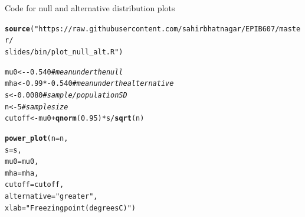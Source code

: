 \documentclass[10pt,handout]{beamer}\usepackage[]{graphicx}\usepackage[]{color}
\makeatletter
\newcommand{\hlnum}[1]{\textcolor[rgb]{0.686,0.059,0.569}{#1}}%
\newcommand{\hlstr}[1]{\textcolor[rgb]{0.192,0.494,0.8}{#1}}%
\newcommand{\hlcom}[1]{\textcolor[rgb]{0.678,0.584,0.686}{\textit{#1}}}%
\newcommand{\hlopt}[1]{\textcolor[rgb]{0,0,0}{#1}}%
\newcommand{\hlstd}[1]{\textcolor[rgb]{0.345,0.345,0.345}{#1}}%
\newcommand{\hlkwb}[1]{\textcolor[rgb]{0.69,0.353,0.396}{#1}}%
\newcommand{\hlkwc}[1]{\textcolor[rgb]{0.333,0.667,0.333}{#1}}%
\newcommand{\hlkwd}[1]{\textcolor[rgb]{0.737,0.353,0.396}{\textbf{#1}}}%
\newenvironment{kframe}{%
 \def\at@end@of@kframe{}%
 \ifinner\ifhmode%
  \def\at@end@of@kframe{\end{minipage}}%
  \begin{minipage}{\columnwidth}%
 \fi\fi%
 \def\FrameCommand##1{\hskip\@totalleftmargin \hskip-\fboxsep
 \colorbox{shadecolor}{##1}\hskip-\fboxsep
     \hskip-\linewidth \hskip-\@totalleftmargin \hskip\columnwidth}%
 \MakeFramed {\advance\hsize-\width
   \@totalleftmargin\z@ \linewidth\hsize
   \@setminipage}}%
 {\par\unskip\endMakeFramed%
 \at@end@of@kframe}
\newenvironment{knitrout}{}{} %
\makeatother
\begin{document}
\begin{frame}[fragile]{Code for null and alternative distribution plots}
\begin{knitrout}\tiny
{}\color{fgcolor}\begin{kframe}
\begin{alltt}
\hlkwd{source}\hlstd{(}\hlstr{"https://raw.githubusercontent.com/sahirbhatnagar/EPIB607/master/
        slides/bin/plot_null_alt.R"}\hlstd{)}

\hlstd{mu0} \hlkwb{<-} \hlopt{-}\hlnum{0.540} \hlcom{# mean under the null}
\hlstd{mha} \hlkwb{<-} \hlnum{0.99}\hlopt{*-}\hlnum{0.540} \hlcom{# mean under the alternative}
\hlstd{s} \hlkwb{<-} \hlnum{0.0080} \hlcom{# sample/population SD}
\hlstd{n} \hlkwb{<-} \hlnum{5} \hlcom{# sample size}
\hlstd{cutoff} \hlkwb{<-} \hlstd{mu0} \hlopt{+} \hlkwd{qnorm}\hlstd{(}\hlnum{0.95}\hlstd{)} \hlopt{*} \hlstd{s} \hlopt{/} \hlkwd{sqrt}\hlstd{(n)}

\hlkwd{power_plot}\hlstd{(}\hlkwc{n} \hlstd{= n,}
\hlkwc{s} \hlstd{= s,}
\hlkwc{mu0} \hlstd{= mu0,}
\hlkwc{mha} \hlstd{= mha,}
\hlkwc{cutoff} \hlstd{= cutoff,}
\hlkwc{alternative} \hlstd{=} \hlstr{"greater"}\hlstd{,}
\hlkwc{xlab} \hlstd{=} \hlstr{"Freezing point (degrees C)"}\hlstd{)}
\end{alltt}
\end{kframe}
\end{knitrout}
\end{frame}
\end{document}
